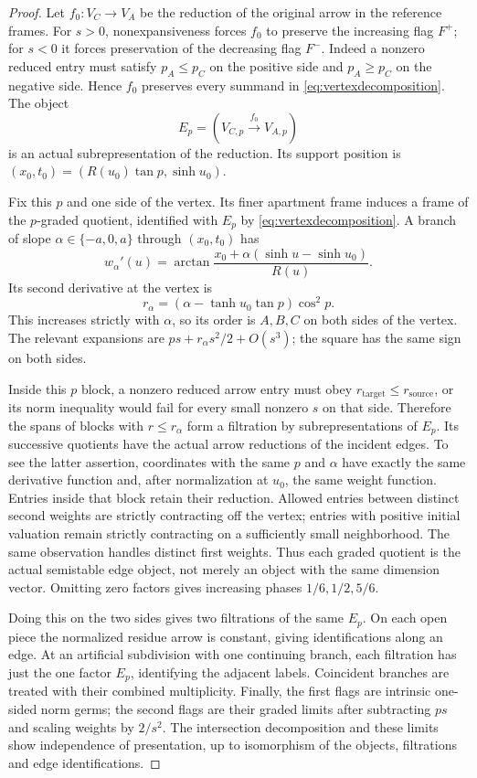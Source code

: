 \begin{proof}
Let $f_0:V_C\to V_A$ be the reduction of the original arrow
in the reference frames. For $s>0$, nonexpansiveness forces
$f_0$ to preserve the increasing flag $F^+$; for $s<0$ it
forces preservation of the decreasing flag $F^-$.
Indeed a nonzero reduced entry must satisfy $p_A\le p_C$
on the positive side and $p_A\ge p_C$ on the negative side.
Hence $f_0$ preserves every summand in
\eqref{eq:vertexdecomposition}. The object
\begin{equation}\label{eq:actualvertexobject}
 E_p=(V_{C,p}\xrightarrow{f_0}V_{A,p})
\end{equation}
is an actual subrepresentation of the reduction. Its support
position is $(x_0,t_0)=(R(u_0)\tan p,\sinh u_0)$.

Fix this $p$ and one side of the vertex. Its finer apartment
frame induces a frame of the $p$-graded quotient, identified
with $E_p$ by \eqref{eq:vertexdecomposition}. A branch of
slope $\alpha\in\{-a,0,a\}$ through $(x_0,t_0)$ has
\[
 w_\alpha'(u)
 =\arctan\frac{x_0+\alpha(\sinh u-\sinh u_0)}{R(u)}.
\]
Its second derivative at the vertex is
\begin{equation}\label{eq:secondvertexweights}
 r_\alpha=(\alpha-\tanh u_0\tan p)\cos^2p.
\end{equation}
This increases strictly with $\alpha$, so its order is $A,B,C$
on both sides of the vertex. The relevant expansions are
$ps+r_\alpha s^2/2+O(s^3)$; the square has the same sign on
both sides.

Inside this $p$ block, a nonzero reduced arrow entry must obey
$r_{\mathrm{target}}\le r_{\mathrm{source}}$, or its norm
inequality would fail for every small nonzero $s$ on that side.
Therefore the spans of blocks with $r\le r_\alpha$ form a
filtration by subrepresentations of $E_p$. Its successive
quotients have the actual arrow reductions of the incident edges.
To see the latter assertion, coordinates with the same $p$ and
$\alpha$ have exactly the same derivative function and, after
normalization at $u_0$, the same weight function. Entries inside
that block retain their reduction. Allowed entries between
distinct second weights are strictly contracting off the vertex;
entries with positive initial valuation remain strictly
contracting on a sufficiently small neighborhood. The same
observation handles distinct first weights. Thus each graded
quotient is the actual semistable edge object, not merely an
object with the same dimension vector. Omitting zero factors
gives increasing phases $1/6,1/2,5/6$.

Doing this on the two sides gives two filtrations of the same
$E_p$. On each open piece the normalized residue arrow is
constant, giving identifications along an edge. At an artificial
subdivision with one continuing branch, each filtration has
just the one factor $E_p$, identifying the adjacent labels.
Coincident branches are treated with their combined multiplicity.
Finally, the first flags are intrinsic one-sided norm germs;
the second flags are their graded limits after subtracting $ps$
and scaling weights by $2/s^2$. The intersection decomposition
and these limits show independence of presentation, up to
isomorphism of the objects, filtrations and edge identifications.
\end{proof}

